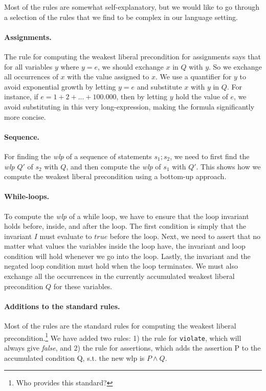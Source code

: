 Most of the rules are somewhat self-explanatory, but we would like to go through a selection of the rules that we find to be complex in our language setting.

\paragraph{Assignments.}
The rule for computing the weakest liberal precondition for assignments says that for all variables $y$ where $y = e$, we should exchange $x$ in $Q$ with $y$. So we exchange all occurrences of $x$ with the value assigned to $x$.
We use a quantifier for $y$ to avoid exponential growth by letting $y=e$ and substitute $x$ with $y$ in $Q$.
For instance, if $e=1+2+...+100.000$, then by letting $y$ hold the value of $e$, we avoid substituting in this very long-expression, making the formula significantly more concise.

\paragraph{Sequence.}
For finding the \textit{wlp} of a sequence of statements $s_1;s_2$, we need to first find the \textit{wlp} $Q'$ of $s_2$ with $Q$, and then compute the \textit{wlp} of $s_1$ with $Q'$.
This shows how we compute the weakest liberal precondition using a bottom-up approach.

\paragraph{While-loops.}
To compute the \textit{wlp} of a while loop, we have to ensure that the loop invariant holds before, inside, and after the loop.
The first condition is simply that the invariant $I$ must evaluate to $true$ before the loop.
Next, we need to assert that no matter what values the variables inside the loop have, the invariant and loop condition will hold whenever we go into the loop.
Lastly, the invariant and the negated loop condition must hold when the loop terminates.
We must also exchange all the occurrences in the currently accumulated weakest liberal precondition $Q$ for these variables.

\paragraph{Additions to the standard rules.}
Most of the rules are the standard rules for computing the weakest liberal precondition.\footnote{Who provides this standard?} We have added two rules: 1) the rule for \texttt{violate}, which will always give \textit{false}, and 2) the rule for assertions, which adds the assertion P to the accumulated condition Q, s.t. the new wlp is $P \land Q$.


